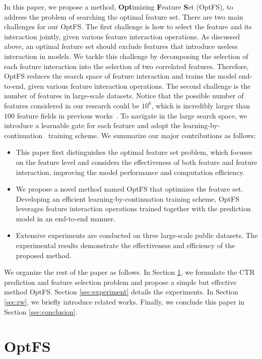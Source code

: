 \documentclass[sigconf]{acmart}
\begin{document}
In this paper, we propose a method, \textbf{Opt}imizing \textbf{F}eature \textbf{S}et (OptFS), to address the problem of searching the optimal feature set. There are two main challenges for our OptFS. 
The first challenge is how to select the feature and its interaction jointly, given various feature interaction operations. As discussed above, an optimal feature set should exclude features that introduce useless interaction in models. We tackle this challenge by decomposing the selection of each feature interaction into the selection of two correlated features. Therefore, OptFS reduces the search space of feature interaction and trains the model end-to-end, given various feature interaction operations.
The second challenge is the number of features in large-scale datasets. Notice that the possible number of features considered in our research could be $10^6$, which is incredibly larger than $100$ feature fields in previous works~\cite{AutoField, LPFS}. To navigate in the large search space, we introduce a learnable gate for each feature and adopt the learning-by-continuation~\cite{DST, Cont_Spar, Grow_Spar} training scheme. We summarize our major contributions as follows:

\begin{itemize}[topsep=0pt,noitemsep,nolistsep,leftmargin=*]
\item This paper first distinguishes the optimal feature set problem, which focuses on the feature level and considers the effectiveness of both feature and feature interaction, improving the model performance and computation efficiency.
    \item We propose a novel method named OptFS that optimizes the feature set. Developing an efficient learning-by-continuation training scheme, OptFS leverages feature interaction operations trained together with the prediction model in an end-to-end manner.
    \item Extensive experiments are conducted on three large-scale public datasets. The experimental results demonstrate the effectiveness and efficiency of the proposed method.
\end{itemize}

We organize the rest of the paper as follows. In Section \ref{sec:method}, we formulate the CTR prediction and feature selection problem and propose a simple but effective method OptFS. Section \ref{sec:experiment} details the experiments. In Section \ref{sec:rw}, we briefly introduce related works. Finally, we conclude this paper in Section \ref{sec:conclusion}.
 \section{OptFS}
\label{sec:method}
\end{document}
